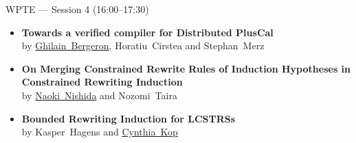 \documentclass[11pt]{beamer}
\newcommand{\sessionbreaktext}{}
\newenvironment{sessionframe}[2]{%
  \renewcommand{\sessionbreaktext}{#2}%
  \begin{frame}[t]{#1}%
}{%
  \end{frame}%
}
\begin{document}
\begin{sessionframe}{WPTE --- Session 4 (16:00--17:30)}{End of Workshop}
  \vspace*{\fill}
  \begin{itemize}
    \item \textbf{Towards a verified compiler for Distributed PlusCal}\\
      by \mbox{\underline{Ghilain Bergeron}}, \mbox{Horatiu Cirstea} and \mbox{Stephan Merz}
    \vspace*{\fill}
    \item \textbf{On Merging Constrained Rewrite Rules of Induction Hypotheses in Constrained Rewriting Induction}\\
      by \mbox{\underline{Naoki Nishida}} and \mbox{Nozomi Taira}
    \vspace*{\fill}
    \item \textbf{Bounded Rewriting Induction for LCSTRSs}\\
      by \mbox{Kasper Hagens} and \mbox{\underline{Cynthia Kop}}
  \end{itemize}
\end{sessionframe}
\end{document}
